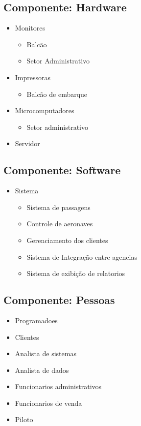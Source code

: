 \subsection{Componente: Hardware}
\begin{itemize}
       \item Monitores
             \begin{itemize}
                    \item Balcão
                    \item Setor Administrativo
             \end{itemize}
             
       \item Impressoras
             \begin{itemize}
                    \item Balcão de embarque
             \end{itemize}
       \item Microcomputadores
             \begin{itemize}
                    \item Setor administrativo
             \end{itemize}
       \item Servidor
\end{itemize}

\subsection{Componente: Software}
\begin{itemize}
       \item Sistema
             \begin{itemize}
                    \item Sistema de passagens
                    \item Controle de aeronaves
                    \item Gerenciamento dos clientes
                    \item Sistema de Integração entre agencias
                    \item Sistema de exibição de relatorios
             \end{itemize}
\end{itemize}



\subsection{Componente: Pessoas}
\begin{itemize}
       \item Programadoes
       \item Clientes
       \item Analista de sistemas
       \item Analista de dados
       \item Funcionarios administrativos
       \item Funcionarios de venda
       \item Piloto
\end{itemize}

